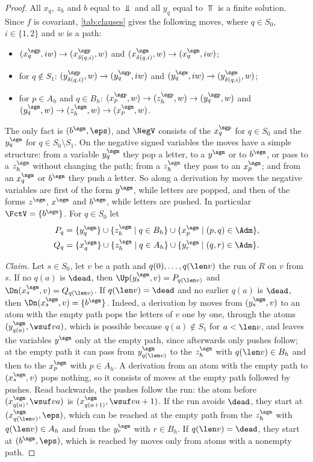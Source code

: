 \begin{proof}
All $x_q$, $z_h$ and $b$ equal to $\Bot$ and all $y_q$ equal to $\Top$ is a
finite solution. Since $f$ is covariant, \cref{tab:clauses} gives the
following moves, where $q\in S_0$, $i\in\{1,2\}$ and $w$ is a path:
\begin{itemize}
\item $(x_q^{\sgp},iw)\to(x_{\delta(q,i)}^{\sgp},w)$ and
  $(x_{\delta(q,i)}^{\sgm},w)\to(x_q^{\sgm},iw)$;
\item for $q\notin S_1$: $(y_{\delta(q,i)}^{\sgp},w)\to(y_q^{\sgp},iw)$ and
  $(y_q^{\sgm},iw)\to(y_{\delta(q,i)}^{\sgm},w)$;
\item for $p\in A_h$ and $q\in B_h$: $(x_p^{\sgp},w)\to(z_h^{\sgp},w)\to
  (y_q^{\sgp},w)$ and $(y_q^{\sgm},w)\to(z_h^{\sgm},w)\to(x_p^{\sgm},w)$.
\end{itemize}
The only fact is $(b^{\sgm},\eps)$, and $\NegV$ consists of the $x_q^{\sgp}$
for $q\in S_0$ and the $y_q^{\sgm}$ for $q\in S_0\setminus S_1$. On the
negative signed variables the moves have a simple structure: from a
variable $y_q^{\sgm}$ they pop a letter, to a $y^{\sgm}$ or to $b^{\sgm}$, or
pass to a $z_h^{\sgm}$ without changing the path; from a $z_h^{\sgm}$ they
pass to an $x_p^{\sgm}$; and from an $x_q^{\sgm}$ or $b^{\sgm}$ they push a
letter. So along a derivation by moves the negative variables are first of
the form $y^{\sgm}$, while letters are popped, and then of the forms
$z^{\sgm}$, $x^{\sgm}$ and $b^{\sgm}$, while letters are pushed. In
particular $\FctV=\{b^{\sgm}\}$. For $q\in S_0$ let
\begin{align*}
  P_q&=\{y_q^{\sgm}\}\cup\{z_h^{\sgm}\mid q\in B_h\}\cup
    \{x_p^{\sgm}\mid(p,q)\in\Adm\},\\
  Q_q&=\{x_q^{\sgm}\}\cup\{z_h^{\sgm}\mid q\in A_h\}\cup
    \{y_r^{\sgm}\mid(q,r)\in\Adm\}.
\end{align*}

\emph{Claim.} Let $s\in S_0$, let $v$ be a path and $q(0),\dots,q(\len v)$
the run of $R$ on $v$ from $s$. If no $q(a)$ is $\dead$, then
$\Up(y_s^{\sgm},v)=P_{q(\len v)}$ and $\Dn(x_s^{\sgm},v)=Q_{q(\len v)}$. If
$q(\len v)=\dead$ and no earlier $q(a)$ is $\dead$, then
$\Dn(x_s^{\sgm},v)=\{b^{\sgm}\}$. Indeed, a derivation by moves from
$(y_s^{\sgm},v)$ to an atom with the empty path pops the letters of $v$ one
by one, through the atoms $(y_{q(a)}^{\sgm},\wsuf va)$, which is possible
because $q(a)\notin S_1$ for $a<\len v$, and leaves the variables $y^{\sgm}$
only at the empty path, since afterwards only pushes follow; at the empty
path it can pass from $y_{q(\len v)}^{\sgm}$ to the $z_h^{\sgm}$ with
$q(\len v)\in B_h$ and then to the $x_p^{\sgm}$ with $p\in A_h$. A derivation
from an atom with the empty path to $(x_s^{\sgm},v)$ pops nothing, so it
consists of moves at the empty path followed by pushes. Read backwards, the
pushes follow the run: the atom before $(x_{q(a)}^{\sgm},\wsuf va)$ is
$(x_{q(a+1)}^{\sgm},\wsuf v{a+1})$. If the run avoids $\dead$, they start at
$(x_{q(\len v)}^{\sgm},\eps)$, which can be reached at the empty path from
the $z_h^{\sgm}$ with $q(\len v)\in A_h$ and from the $y_r^{\sgm}$ with
$r\in B_h$. If $q(\len v)=\dead$, they start at $(b^{\sgm},\eps)$, which is
reached by moves only from atoms with a nonempty path.


\end{proof}
